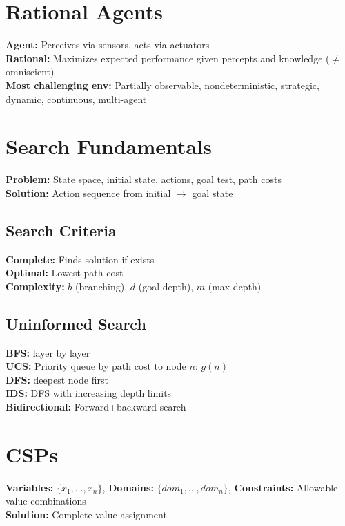 \documentclass[8pt,landscape,a4paper]{article}
\begin{document}
\begin{multicols*}{3}

\section{Rational Agents}
\textbf{Agent:} Perceives via sensors, acts via actuators\\
\textbf{Rational:} Maximizes expected performance given percepts and knowledge ($\neq$ omniscient)\\
\textbf{Most challenging env:} Partially observable, nondeterministic, strategic, dynamic, continuous, multi-agent

\section{Search Fundamentals}
\textbf{Problem:} State space, initial state, actions, goal test, path costs\\
\textbf{Solution:} Action sequence from initial $\rightarrow$ goal state

\subsection{Search Criteria}
\textbf{Complete:} Finds solution if exists\\
\textbf{Optimal:} Lowest path cost\\
\textbf{Complexity:} $b$ (branching), $d$ (goal depth), $m$ (max depth)

\subsection{Uninformed Search}
\textbf{BFS:} layer by layer\\
\textbf{UCS:} Priority queue by path cost to node $n$: $g(n)$\\
\textbf{DFS:} deepest node first\\
\textbf{IDS:} DFS with increasing depth limits\\
\textbf{Bidirectional:} Forward+backward search

\section{CSPs}
\textbf{Variables:} $\{x_1,\ldots,x_n\}$, \textbf{Domains:} $\{dom_1,\ldots,dom_n\}$, \textbf{Constraints:} Allowable value combinations\\
\textbf{Solution:} Complete value assignment


\end{multicols*}
\end{document}
